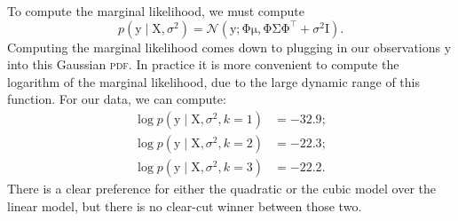 \documentclass{article}
\newcommand{\acro}[1]{\textsc{\MakeLowercase{#1}}}
\newcommand{\given}{\mid}
\newcommand{\mc}[1]{\mathcal{#1}}
\newcommand{\mat}[1]{\bm{\mathrm{#1}}}
\renewcommand{\vec}[1]{\bm{\mathrm{#1}}}
\newcommand{\trans}{^\top}
\begin{document}
To compute the marginal likelihood, we must compute
\begin{equation*}
  p(\vec{y} \given \mat{X}, \sigma^2)
  =
  \mc{N}(\vec{y};
  \mat{\Phi}\vec{\mu},
  \mat{\Phi}\mat{\Sigma}\mat{\Phi}\trans + \sigma^2 \mat{I}).
\end{equation*}
Computing the marginal likelihood comes down to plugging in our
observations $\vec{y}$ into this Gaussian \acro{PDF}.  In practice it
is more convenient to compute the logarithm of the marginal
likelihood, due to the large dynamic range of this function.  For our
data, we can compute:
\begin{align*}
  \log p(\vec{y} \given \mat{X}, \sigma^2, k = 1)
  &= -32.9; \\
  \log p(\vec{y} \given \mat{X}, \sigma^2, k = 2)
  &= -22.3; \\
  \log p(\vec{y} \given \mat{X}, \sigma^2, k = 3)
  &= -22.2.
\end{align*}
There is a clear preference for either the quadratic or the cubic
model over the linear model, but there is no clear-cut winner between
those two.
\end{document}
